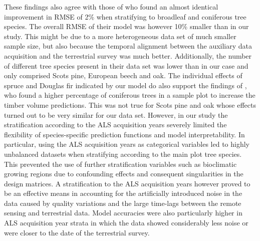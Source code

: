 {These findings also agree with those of \citet{latifi2012} who found an almost identical improvement in RMSE of 2\% when stratifying to broadleaf and coniferous tree species. The overall RMSE of their model  was however 10\% smaller than in our study. This might be due to a more heterogeneous data set of much smaller sample size, but also because the temporal alignment between the auxiliary data acquisition and the terrestrial survey was much better. Additionally, the number of different tree species present in their data set was lower than in our case and only comprised Scots pine, European beech and oak. The individual effects of spruce and Douglas fir indicated by our model do also support the findings of \citet{breidenbach2008}, who found a higher percentage of coniferous trees in a sample plot to increase the timber volume predictions. This was not true for Scots pine and oak whose effects turned out to be very similar for our data set. However, in our study the stratification according to the ALS acquisition years severely limited the flexibility of species-specific prediction functions and model interpretability.} In particular, using the ALS acquisition years as categorical variables led to highly unbalanced datasets when stratifying according to the main plot tree species. This prevented the use of further stratification variables such as bioclimatic growing regions due to confounding effects and consequent singularities in the design matrices.  A stratification to the ALS acquisition years however proved to be an effective means in accounting for the artificially introduced noise in the data caused by quality variations and the large time-lags between the remote sensing and terrestrial data.  Model accuracies were also particularly higher in ALS acquisition year strata in which the data showed considerably less noise or were closer to the date of the terrestrial survey. \par

